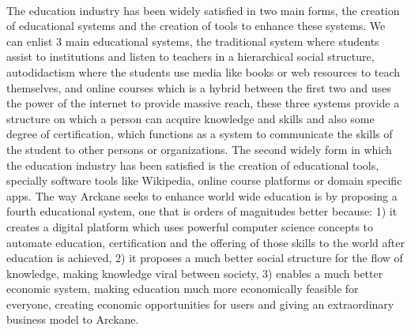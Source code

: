 \paragraph{} The education industry has been widely satisfied in two main forms, the creation of educational systems and the creation of tools to enhance these systems. We can enlist 3 main educational systems, the traditional system where students assist to institutions and listen to teachers in a hierarchical social structure, autodidactism where the students use media like books or web resources to teach themselves, and online courses which is a hybrid between the first two and uses the power of the internet to provide massive reach, these three systems provide a structure on which a person can acquire knowledge and skills and also some degree of certification, which functions as a system to communicate the skills of the student to other persons or organizations. The second widely form in which the education industry has been satisfied is the creation of educational tools, specially software tools like Wikipedia, online course platforms or domain specific apps. The way Arckane seeks to enhance world wide education is by proposing a fourth educational system, one that is orders of magnitudes better because: 1) it creates a digital platform which uses powerful computer science concepts to automate education, certification and the offering of those skills to the world after education is achieved, 2) it proposes a much better social structure for the flow of knowledge, making knowledge viral between society, 3) enables a much better economic system, making education much more economically feasible for everyone, creating economic opportunities for users and giving an extraordinary business model to Arckane. 

